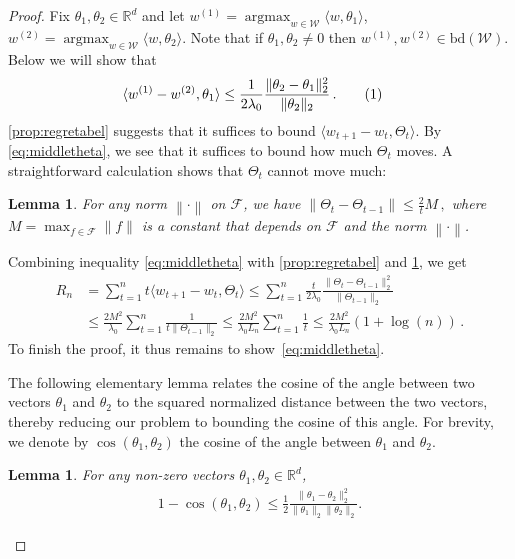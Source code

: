 \documentclass[english]{article}
\newcommand{\cW}{\mathcal{W}}
\newcommand{\cF}{\mathcal{F}}
\newcommand{\real}{\mathbb{R}}
\newcommand{\inpro}[2]{\langle #1, #2\rangle}
\newcommand{\ip}[1]{\langle#1\rangle}
\newcommand{\norm}[1]{\left\| #1 \right\|}
\newcommand{\bd}{\mathrm{bd}}
\newcommand{\inangle}[2]{(#1,#2)}
\newcommand\numberthis{\addtocounter{equation}{1}\tag{\theequation}}
\DeclareMathOperator*{\argmax}{argmax}
\newtheorem{lemma}[thm]{Lemma}
\begin{document}
\begin{proof}
Fix  $\theta_1, \theta_2 \in \real^d$ and let 
$w^{(1)} = \argmax_{w\in\cW}\inpro{w}{\theta_1}$,
$w^{(2)} = \argmax_{w\in\cW}\inpro{w}{\theta_2}$. 
Note that if $\theta_1,\theta_2\ne 0$ then $w^{(1)} , w^{(2)}  \in \bd(\cW)$. 
Below we will show that
\begin{align*}
\inpro{w^{(1)} - w^{(2)} }{\theta_1} 
	& \le \frac{1}{2\lambda_0} \frac{\|\theta_2 - \theta_1\|_2^2}{\|\theta_2\|_2}\,.
	 \numberthis\label{eq:middletheta}
\end{align*}
\cref{prop:regretabel}  suggests that it suffices to bound $\ip{w_{t+1}-w_t,\Theta_t}$. By \eqref{eq:middletheta}, we see
 that it suffices to bound how much $\Theta_t$ moves.
A straightforward calculation shows that $\Theta_t$ cannot move much:
\begin{lemma}
\label{prop:avgdiff}
For any norm $\norm{\cdot}$ on $\cF$, we have 
$
\|\Theta_t - \Theta_{t-1}\| \le \frac{2}{t}M\,,
$
where $M = \max_{f\in\cF} \|f\|$ is a constant that depends on $\cF$ and the norm $\norm{\cdot}$.
\end{lemma}
Combining inequality \eqref{eq:middletheta} with \cref{prop:regretabel} and \cref{prop:avgdiff}, we get
\begin{align*}
R_n &= \sum_{t=1}^{n} t\ip{ w_{t+1}-w_t,\Theta_t} %
\le \sum_{t=1}^{n} \frac{t}{2\lambda_0} \frac{\|\Theta_t - \Theta_{t-1}\|_2^2}{\|\Theta_{t-1}\|_2} \\
&\le \frac{2M^2}{\lambda_0}\sum_{t=1}^{n} \frac{1}{t\|\Theta_{t-1}\|_2} \le \frac{2M^2}{\lambda_0L_n} \sum_{t=1}^{n} \frac{1}{t}
\le \frac{2M^2}{\lambda_0L_n} (1+\log(n))\,.
\end{align*}
To finish the proof, it thus remains to show~\eqref{eq:middletheta}.

The following elementary lemma relates the cosine of the angle between two vectors $\theta_1$ and $\theta_2$ to the squared normalized distance between 
the two vectors, thereby reducing our problem to bounding the cosine of this angle.
For brevity, we denote by $\cos\inangle{\theta_1}{\theta_2}$
the cosine of the angle between $\theta_1$ and $\theta_2$. 
\begin{lemma}
\label{lem:upperboundcos}
For any non-zero vectors $\theta_1, \theta_2 \in \real^d$,
\begin{align}
1- \cos \inangle{\theta_1}{\theta_2} \le \frac{1}{2} \frac{\|\theta_1 - \theta_2\|_2^2}{\|\theta_1\|_2\|\theta_2\|_2}.
\label{eq:angleineq}
\end{align}
\end{lemma}


\end{proof}
\end{document}
